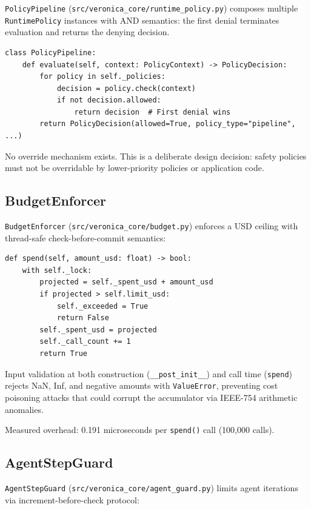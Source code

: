 \documentclass[11pt]{article}
\begin{document}
\texttt{PolicyPipeline}
(\texttt{src/veronica\_core/runtime\_policy.py}) composes multiple
\texttt{RuntimePolicy} instances with AND semantics: the first denial
terminates evaluation and returns the denying decision.

\begin{lstlisting}
class PolicyPipeline:
    def evaluate(self, context: PolicyContext) -> PolicyDecision:
        for policy in self._policies:
            decision = policy.check(context)
            if not decision.allowed:
                return decision  # First denial wins
        return PolicyDecision(allowed=True, policy_type="pipeline", ...)
\end{lstlisting}

No override mechanism exists. This is a deliberate design decision: safety
policies must not be overridable by lower-priority policies or application
code.

\subsection{BudgetEnforcer}

\texttt{BudgetEnforcer} (\texttt{src/veronica\_core/budget.py}) enforces a USD
ceiling with thread-safe check-before-commit semantics:

\begin{lstlisting}
def spend(self, amount_usd: float) -> bool:
    with self._lock:
        projected = self._spent_usd + amount_usd
        if projected > self.limit_usd:
            self._exceeded = True
            return False
        self._spent_usd = projected
        self._call_count += 1
        return True
\end{lstlisting}

Input validation at both construction (\texttt{\_\_post\_init\_\_}) and call
time (\texttt{spend}) rejects NaN, Inf, and negative amounts with
\texttt{ValueError}, preventing cost poisoning attacks that could corrupt the
accumulator via IEEE-754 arithmetic anomalies.

Measured overhead: 0.191 microseconds per \texttt{spend()} call (100,000
calls).

\subsection{AgentStepGuard}

\texttt{AgentStepGuard} (\texttt{src/veronica\_core/agent\_guard.py}) limits
agent iterations via increment-before-check protocol:
\end{document}
